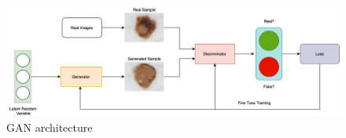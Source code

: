 \begin{figure}
    \centerline{\includegraphics[width=1\columnwidth]{02-related-works/figures/gan-architecture.png}}
    \caption{ GAN architecture }
    \label{fig:gan-architecture}
\end{figure}